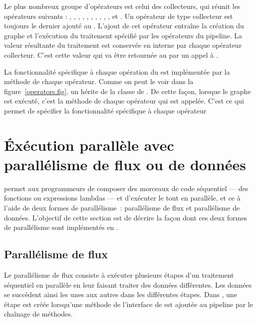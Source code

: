 Le plus nombreux groupe d'op\'erateurs est celui des collecteurs, qui réunit les op\'erateurs suivants : , , , , , , , , , ,  et . Un op\'erateur de type collecteur est toujours le dernier ajout\'e au . L'ajout de cet op\'erateur entra\^ine la création du graphe  et l'ex\'ecution du traitement spécifié par les opérateurs du pipeline. La valeur r\'esultante du traitement est conserv\'ee en interne par chaque op\'erateur collecteur. C'est cette valeur qui va \^etre retourn\'ee au  par un appel à .

La fonctionnalit\'e sp\'ecifique \`a chaque op\'eration du  est impl\'ement\'ee par la m\'ethode  de chaque op\'erateur. Comme on peut le voir dans la figure~\ref{operators.fig}, un  h\'erite de la classe  de . De cette fa\c{c}on, lorsque le graphe  est exécuté, c'est la méthode  de chaque op\'erateur qui est appel\'ee. C'est ce qui permet de spécifier la fonctionnalit\'e spécifique à chaque opérateur 








\section{\'Ex\'ecution parall\`ele avec parall\'elisme de flux ou de donn\'ees}

 permet aux programmeurs de composer des morceaux de code s\'equentiel --- des fonctions ou expressions lambdas --- et d'ex\'ecuter le tout en parall\`ele, et ce à l'aide de deux formes de parallélisme~:
parall\'elisme de flux et parall\'elisme de donn\'ees.
%
L'objectif de cette section est de d\'ecrire la façon dont ces deux formes de parall\'elisme sont impl\'ement\'es en . 

\subsection{Parall\'elisme de flux}
\label{ParallelismeDuFlux.sect}

Le parall\'elisme de flux consiste \`a ex\'ecuter plusieurs \'etapes d'un traitement s\'equentiel en parall\`ele en leur faisant traiter des donn\'ees diff\'erentes. Les donn\'ees se succ\`edent ainsi les unes aux autres dans les diff\'erentes \'etapes.
%
Dans , une {\'etape} est cr\'e\'ee lorsqu'une m\'ethode de l'interface de  est ajout\'ee au {pipeline} par le cha\^inage de m\'ethodes.

